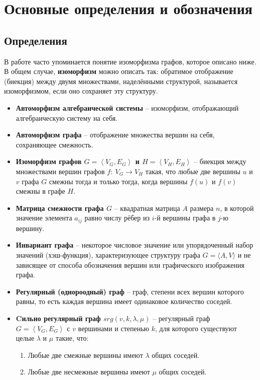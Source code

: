 \section{Основные определения и обозначения}
\label{sec:Definition_2} 
\large

\subsection{Определения}

В работе часто упоминается понятие изоморфизма графов, которое описано ниже. В общем случае, \textbf{изоморфизм} можно описать так: обратимое отображение (биекция) между двумя множествами, наделёнными структурой, называется изоморфизмом, если оно сохраняет эту структуру.

\begin{itemize}
\item \textbf{Автоморфизм алгебраической системы} -- изоморфизм, отображающий алгебраическую систему на себя.

\item \textbf{Автоморфизм графа} -- отображение множества вершин на себя, сохраняющее смежность.

\item \textbf{ Изоморфизм графов $G=\left\langle V_{G},E_{G}\right\rangle$ и $H=\left\langle V_{H},E_{H}\right\rangle$} -- биекция между множествами вершин графов $f\colon \ V_{G}\rightarrow V_{H}$ такая, что любые две вершины $u$ и $v$ графа $G$ смежны тогда и только тогда, когда вершины $f(u)$ и $f(v)$ смежны в графе $H$.

\item \textbf{ Матрица смежности графа $G$} -- квадратная матрица $A$ размера $n$, в которой значение элемента $a_{ij}$ равно числу рёбер из $i$-й вершины графа в $j$-ю вершину.

\item \textbf{Инвариант графа} -- некоторое числовое значение или упорядоченный набор значений (хэш-функция), характеризующее структуру графа $ G=\langle A,V\rangle $  и не зависящее от способа обозначения вершин или графического изображения графа.

\item \textbf{Регулярный (однороодный) граф} -- граф, степени всех вершин которого равны, то есть каждая вершина имеет одинаковое количество соседей.

\item \textbf{ Cильно регулярный граф $srg(v, k, \lambda, \mu)$} -- регулярный граф $G=\left\langle V_{G},E_{G}\right\rangle$ с $v$ вершинами и степенью $k$, для которого существуют целые $\lambda$ и $\mu$ такие, что:
\begin{enumerate}
\item Любые две смежные вершины имеют $\lambda$ общих соседей.
\item Любые две несмежные вершины имеют $\mu$ общих соседей.
\end{enumerate}




\end{itemize}




